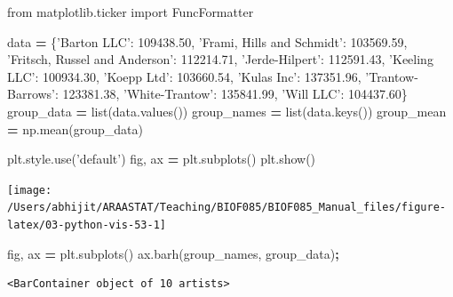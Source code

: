 \documentclass[
  letterpaper,
]{scrbook}
\newenvironment{Shaded}{\begin{snugshade}}{\end{snugshade}}
\newcommand{\BuiltInTok}[1]{#1}
\newcommand{\FloatTok}[1]{\textcolor[rgb]{0.00,0.00,0.81}{#1}}
\newcommand{\ImportTok}[1]{#1}
\newcommand{\NormalTok}[1]{#1}
\newcommand{\OperatorTok}[1]{\textcolor[rgb]{0.81,0.36,0.00}{\textbf{#1}}}
\newcommand{\StringTok}[1]{\textcolor[rgb]{0.31,0.60,0.02}{#1}}
\begin{document}
\begin{Shaded}
\begin{Highlighting}[]
\ImportTok{from}\NormalTok{ matplotlib.ticker }\ImportTok{import}\NormalTok{ FuncFormatter}

\NormalTok{data }\OperatorTok{=}\NormalTok{ \{}\StringTok{'Barton LLC'}\NormalTok{: }\FloatTok{109438.50}\NormalTok{,}
        \StringTok{'Frami, Hills and Schmidt'}\NormalTok{: }\FloatTok{103569.59}\NormalTok{,}
        \StringTok{'Fritsch, Russel and Anderson'}\NormalTok{: }\FloatTok{112214.71}\NormalTok{,}
        \StringTok{'Jerde-Hilpert'}\NormalTok{: }\FloatTok{112591.43}\NormalTok{,}
        \StringTok{'Keeling LLC'}\NormalTok{: }\FloatTok{100934.30}\NormalTok{,}
        \StringTok{'Koepp Ltd'}\NormalTok{: }\FloatTok{103660.54}\NormalTok{,}
        \StringTok{'Kulas Inc'}\NormalTok{: }\FloatTok{137351.96}\NormalTok{,}
        \StringTok{'Trantow-Barrows'}\NormalTok{: }\FloatTok{123381.38}\NormalTok{,}
        \StringTok{'White-Trantow'}\NormalTok{: }\FloatTok{135841.99}\NormalTok{,}
        \StringTok{'Will LLC'}\NormalTok{: }\FloatTok{104437.60}\NormalTok{\}}
\NormalTok{group_data }\OperatorTok{=} \BuiltInTok{list}\NormalTok{(data.values())}
\NormalTok{group_names }\OperatorTok{=} \BuiltInTok{list}\NormalTok{(data.keys())}
\NormalTok{group_mean }\OperatorTok{=}\NormalTok{ np.mean(group_data)}
\end{Highlighting}
\end{Shaded}

\begin{Shaded}
\begin{Highlighting}[]
\NormalTok{plt.style.use(}\StringTok{'default'}\NormalTok{)}
\NormalTok{fig, ax }\OperatorTok{=}\NormalTok{ plt.subplots()}
\NormalTok{plt.show()}
\end{Highlighting}
\end{Shaded}

\begin{center}\texttt{[image: /Users/abhijit/ARAASTAT/Teaching/BIOF085/BIOF085\_Manual\_files/figure-latex/03-python-vis-53-1]} \end{center}

\begin{Shaded}
\begin{Highlighting}[]
\NormalTok{fig, ax }\OperatorTok{=}\NormalTok{ plt.subplots()}
\NormalTok{ax.barh(group_names, group_data)}\OperatorTok{;}
\end{Highlighting}
\end{Shaded}

\begin{verbatim}
<BarContainer object of 10 artists>
\end{verbatim}
\end{document}
